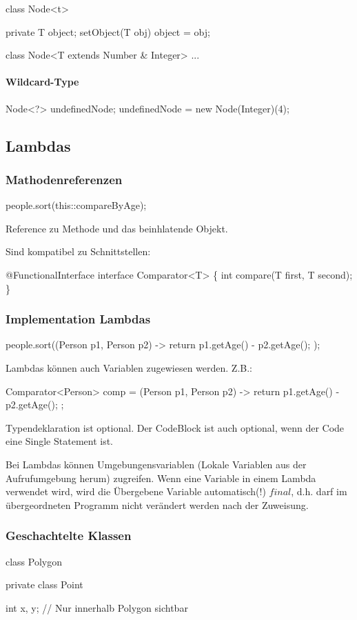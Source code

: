	class Node<t> {
		
		private T object;
		setObject(T obj) {
			object = obj;
		}
	
	
	class Node<T extends Number \& Integer> { ... }
	
	\paragraph{Wildcard-Type}
	
	Node<?> undefinedNode;
	undefinedNode = new Node(Integer)(4);
	
	

\subsection{Lambdas}

\subsubsection{Mathodenreferenzen}
	people.sort(this::compareByAge);
	
	Reference zu Methode und das beinhlatende Objekt.
	
	Sind kompatibel zu Schnittstellen:
	
	@FunctionalInterface
	interface Comparator<T> \{
		int compare(T first, T second);
	\}

\subsubsection{Implementation Lambdas}

	people.sort((Person p1, Person p2) -> {
		return p1.getAge() - p2.getAge();
	});
	
	
	Lambdas können auch Variablen zugewiesen werden. Z.B.:
	
	Comparator<Person> comp = (Person p1, Person p2) -> {
		return p1.getAge() - p2.getAge();
	};
	
	
	Typendeklaration ist optional. Der CodeBlock ist auch optional, wenn der Code eine Single Statement ist.
	
	Bei Lambdas können Umgebungensvariablen (Lokale Variablen aus der Aufrufumgebung herum) zugreifen. Wenn eine Variable in einem Lambda verwendet wird, wird die Übergebene Variable automatisch(!) $final$, d.h. darf im übergeordneten Programm nicht verändert werden nach der Zuweisung.

\subsubsection{Geschachtelte Klassen}
	class Polygon {
		private class Point {
			int x, y; // Nur innerhalb Polygon sichtbar
			
}}}
